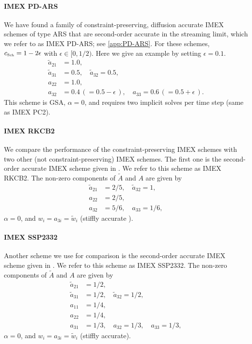 \paragraph{IMEX PD-ARS}

We have found a family of constraint-preserving, diffusion accurate IMEX schemes of type ARS that are second-order accurate in the streaming limit, which we refer to as IMEX PD-ARS; see \ref{app:PD-ARS}.  
For these schemes, $c_{\mbox{\tiny Sch}}= 1 - 2\epsilon$ with $\epsilon \in [0, 1/2)$.
Here we give an example by setting $\epsilon=0.1$.
\begin{align*}
  \tilde{a}_{21} & = 1.0, \\
  \tilde{a}_{31} & = 0.5, \quad \tilde{a}_{32} = 0.5, \\
  a_{22} & = 1.0, \nonumber \\
  a_{32} & = 0.4 \,( = 0.5 - \epsilon\,), \quad a_{33} = 0.6 \,( = 0.5 + \epsilon\,). 
\end{align*}
This scheme is GSA, $\alpha=0$, and requires two implicit solves per time step (same as IMEX PC2).  

\paragraph{IMEX RKCB2}

We compare the performance of the constraint-preserving IMEX schemes with two other (not constraint-preserving) IMEX schemes.  
The first one is the second-order accurate IMEX scheme given in \cite{cavaglieriBewley2015}.  
We refer to this scheme as IMEX RKCB2.  
The non-zero components of $\tilde{A}$ and $A$ are given by
\begin{align*}
  \tilde{a}_{21} &= 2/5, \quad \tilde{a}_{32} = 1, \\
  a_{22} &= 2/5, \nonumber \\
  a_{32} &= 5/6, \quad a_{33} = 1/6,
\end{align*}
$\alpha=0$, and $w_{i} = a_{3i} = \tilde{w}_{i}$ (stiffly accurate \cite{pareschiRusso_2005}).

\paragraph{IMEX SSP2332}

Another scheme we use for comparison is the second-order accurate IMEX scheme given in \cite{pareschiRusso_2005}.  
We refer to this scheme as IMEX SSP2332.  
The non-zero components of $\tilde{A}$ and $A$ are given by
\begin{align*}
  \tilde{a}_{21} &= 1/2, \\
  \tilde{a}_{31} &= 1/2, \quad \tilde{a}_{32} = 1/2, \\
  a_{11} &= 1/4, \\
  a_{22} &= 1/4, \\
  a_{31} &= 1/3, \quad a_{32} = 1/3, \quad a_{33} = 1/3, 
\end{align*}
$\alpha=0$, and $w_{i} = a_{3i} = \tilde{w}_{i}$ (stiffly accurate).

